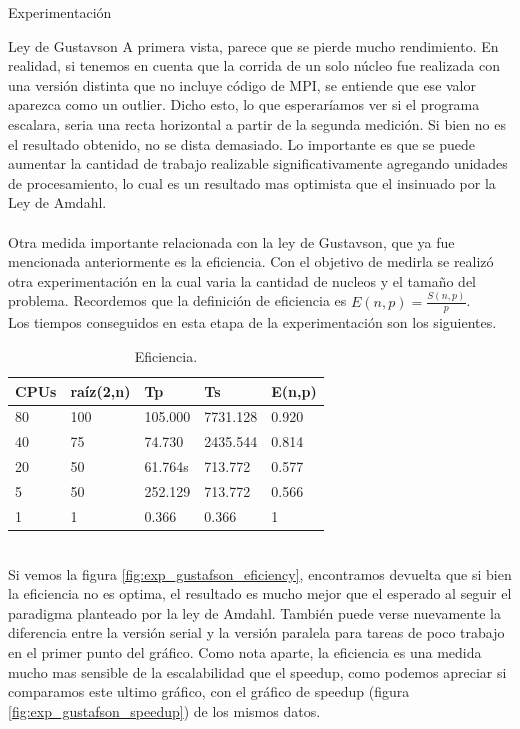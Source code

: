 \begin{section}{Experimentación}
\begin{subsection}{Ley de Gustavson}
 A primera vista, parece que se pierde mucho rendimiento. En realidad, si tenemos en cuenta que la corrida de un solo núcleo fue realizada con una versión distinta que no incluye código de MPI, se entiende que ese valor aparezca como un outlier. Dicho esto, lo que esperaríamos ver si el programa escalara, seria una recta horizontal a partir de la segunda medición. Si bien no es el resultado obtenido, no se dista demasiado. Lo importante es que se puede aumentar la cantidad de trabajo realizable significativamente agregando unidades de procesamiento, lo cual es un resultado mas optimista que el insinuado por la Ley de Amdahl.
~\\
~\\
Otra medida importante relacionada con la ley de Gustavson, que ya fue mencionada anteriormente es la eficiencia. Con el objetivo de medirla se realizó otra experimentación en la cual varia la cantidad de nucleos y el tamaño del problema. Recordemos que la definición de eficiencia es  $E(n,p) = \frac{S(n,p)}{p}$.
~\\
Los tiempos conseguidos en esta etapa de la experimentación son los siguientes.
~\\

\begin{center}
\begin{table}[h]
    \begin{tabular}{ | l | l | l | l | l |}
    \hline
CPUs & raíz(2,n) & Tp & Ts & E(n,p) \\ \hline

80   & 100  &  105.000 & 7731.128 & 0.920 \\ \hline
40   & 75   &  74.730  & 2435.544 & 0.814 \\ \hline
20   & 50   &  61.764s & 713.772 & 0.577 \\ \hline
5    & 50   &  252.129 & 713.772 & 0.566 \\ \hline
1    & 1    &  0.366   & 0.366 & 1 \\ \hline
   \end{tabular}
    \caption{Eficiencia. }
\end{table}
\end{center}
~\\


Si vemos la figura \ref{fig:exp_gustafson_eficiency}, encontramos devuelta que si bien la eficiencia no es optima, el resultado es mucho mejor que el esperado al seguir el paradigma planteado por la ley de Amdahl. También puede verse nuevamente la diferencia entre la versión serial y la versión paralela para tareas de poco trabajo en el primer punto del gráfico.
Como nota aparte, la eficiencia es una medida mucho mas sensible de la escalabilidad que el speedup, como podemos apreciar si comparamos este ultimo gráfico, con el gráfico de speedup (figura \ref{fig:exp_gustafson_speedup}) de los mismos datos.



\end{subsection}
\end{section}

